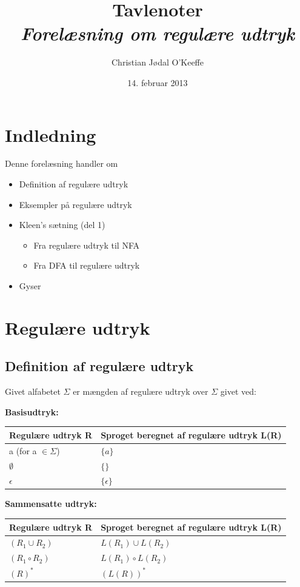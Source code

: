 \documentclass[a4paper,10pt,article]{memoir}
\title{Tavlenoter \\ \emph{Forelæsning om regulære udtryk}}
\author{Christian Jødal O'Keeffe}
\date{14. februar 2013}
\begin{document}
\maketitle

\tableofcontents*

\chapter{Indledning}

Denne forelæsning handler om

\begin{itemize}
\item Definition af regulære udtryk
\item Eksempler på regulære udtryk
\item Kleen's sætning (del 1)
\begin{itemize}
\item Fra regulære udtryk til NFA
\item Fra DFA til regulære udtryk
\end{itemize}
\item Gyser
\end{itemize}

\chapter{Regulære udtryk}
\section{Definition af regulære udtryk}
\begin{definition}
Givet alfabetet $\Sigma$ er mængden af regulære udtryk over $\Sigma$ givet ved:


\begin{table}[h]
    \textbf{Basisudtryk:}

\begin{tabular}{|l|l|}
        \hline
        \textbf{Regulære udtryk R} & \textbf{Sproget beregnet af regulære udtryk L(R)} \\ \hline
        a (for a $\in \Sigma$) & $\{a\}$ \\ 
        $\emptyset$ &$\{\}$ \\ 
        $\epsilon$ & $\{\epsilon\}$ \\
        \hline
    \end{tabular}
\end{table}

\begin{table}[h]
    \textbf{Sammensatte udtryk:}

\begin{tabular}{|l|l|}
        \hline
        \textbf{Regulære udtryk R} & \textbf{Sproget beregnet af regulære udtryk L(R)} \\ \hline
        $(R_1 \cup R_2)$ & $L(R_1) \cup L(R_2)$ \\ 
        $(R_1 \circ R_2)$ & $L(R_1) \circ L(R_2)$  \\ 
        $(R)^*$ & $(L(R))^*$ \\
        \hline
    \end{tabular}
\end{table}
\end{definition}
\end{document}
